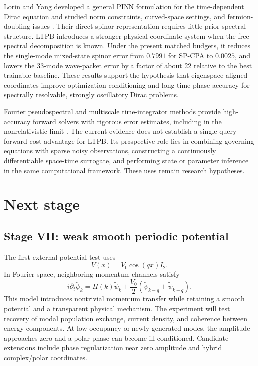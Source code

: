 \documentclass[a4paper,11pt]{article}
\begin{document}
Lorin and Yang developed a general PINN formulation for the time-dependent
Dirac equation and studied norm constraints, curved-space settings, and
fermion-doubling issues \cite{lorin2022}. Their direct spinor representation
requires little prior spectral structure. LTPB introduces a stronger physical
coordinate system when the free spectral decomposition is known. Under the
present matched budgets, it reduces the single-mode mixed-state spinor error
from \(0.7991\) for SP-CPA to \(0.0025\), and lowers the 33-mode wave-packet
error by a factor of about 22 relative to the best trainable baseline. These
results support the hypothesis that eigenspace-aligned coordinates improve
optimization conditioning and long-time phase accuracy for spectrally
resolvable, strongly oscillatory Dirac problems.

Fourier pseudospectral and multiscale time-integrator methods provide
high-accuracy forward solvers with rigorous error estimates, including in the
nonrelativistic limit \cite{bao2016}. The current evidence does not establish a
single-query forward-cost advantage for LTPB. Its prospective role lies in
combining governing equations with sparse noisy observations, constructing a
continuously differentiable space-time surrogate, and performing state or
parameter inference in the same computational framework. These uses remain
research hypotheses.

\section{Next stage}

\subsection{Stage VII: weak smooth periodic potential}

The first external-potential test uses
\begin{equation}
V(x)=V_0\cos(qx)I_2.
\end{equation}
In Fourier space, neighboring momentum channels satisfy
\begin{equation}
i\partial_t\widetilde\psi_k=
H(k)\widetilde\psi_k+\frac{V_0}{2}
\left(\widetilde\psi_{k-q}+\widetilde\psi_{k+q}\right).
\end{equation}
This model introduces nontrivial momentum transfer while retaining a smooth
potential and a transparent physical mechanism. The experiment will test
recovery of modal population exchange, current density, and coherence between
energy components. At low-occupancy or newly generated modes, the amplitude
approaches zero and a polar phase can become ill-conditioned. Candidate
extensions include phase regularization near zero amplitude and hybrid
complex/polar coordinates.
\end{document}
